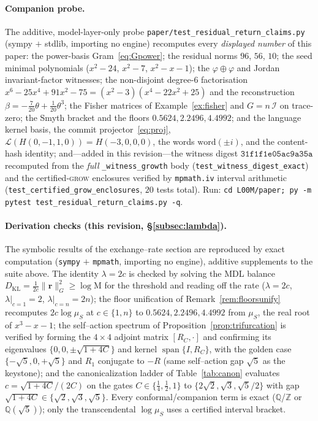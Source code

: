 \documentclass[11pt]{article}
\theoremstyle{plain}
\theoremstyle{definition}
\theoremstyle{remark}
\newcommand{\Q}{\mathbb{Q}}
\newcommand{\Z}{\mathbb{Z}}
\newcommand{\Mah}{\mathrm{M}}
\newcommand{\Fish}{\mathcal{I}}
\newcommand{\rr}{\mathbf{r}}
\newcommand{\GG}{G}
\newcommand{\Lop}{\mathcal{L}}
\DeclareMathOperator{\spn}{span}
\begin{document}
\paragraph{Companion probe.} The additive, model-layer-only probe
\texttt{paper/test\_residual\_return\_claims.py} (sympy $+$ stdlib, importing no engine) recomputes every
\emph{displayed number} of this paper: the power-basis Gram~\eqref{eq:Gpower}; the residual norms $96$, $56$,
$10$; the seed minimal polynomials ($x^2-24$, $x^2-7$, $x^2-x-1$); the $\varphi\oplus\varphi$ and Jordan
invariant-factor witnesses; the non-disjoint degree-$6$ factorisation
$x^6-25x^4+91x^2-75=(x^2-3)(x^4-22x^2+25)$ and the reconstruction
$\beta=-\tfrac7{20}\theta+\tfrac1{20}\theta^3$; the Fisher matrices of Example~\ref{ex:fisher} and
$\GG=n\,\Fish$ on trace-zero; the Smyth bracket and the floors $0.5624,2.2496,4.4992$; and the language
kernel basis, the commit projector~\eqref{eq:proj}, $\Lop(H(0,-1,1,0))=H(-3,0,0,0)$, the words
$\mathrm{word}(\pm i)$, and the content-hash identity; and---added in this revision---the witness digest
$\texttt{31f1f1e05ac9a35a}$ recomputed from the \emph{full} \texttt{\_witness\_growth} body
(\texttt{test\_witness\_digest\_exact}) and the certified-\textsc{grow} enclosures verified by
\texttt{mpmath.iv} interval arithmetic (\texttt{test\_certified\_grow\_enclosures}, $20$ tests total). Run:
\texttt{cd L00M/paper; py -m pytest test\_residual\_return\_claims.py -q}.

\paragraph{Derivation checks (this revision, \S\ref{subsec:lambda}).} The symbolic results of the exchange--rate
section are reproduced by exact computation (\texttt{sympy} $+$ \texttt{mpmath}, importing no engine), additive
supplements to the suite above. The identity $\lambda=2c$ is checked by solving the MDL balance
$D_{\mathrm{KL}}=\tfrac1{2c}\lVert\rr\rVert_\GG^2\ge\log\Mah$ for the threshold and reading off the rate
($\lambda=2c$, $\lambda|_{c=1}=2$, $\lambda|_{c=n}=2n$); the floor unification of Remark~\ref{rem:floorsunify}
recomputes $2c\log\mu_S$ at $c\in\{1,n\}$ to $0.5624,2.2496,4.4992$ from $\mu_S$, the real root of $x^3-x-1$; the
self--action spectrum of Proposition~\ref{prop:trifurcation} is verified by forming the $4\times4$ adjoint matrix
$[R_C,\cdot]$ and confirming its eigenvalues $\{0,0,\pm\sqrt{1+4C}\}$ and kernel $\spn\{I,R_C\}$, with the golden
case $\{-\sqrt5,0,+\sqrt5\}$ and $R_1$ conjugate to $-R$ (same self--action gap $\sqrt5$ as the keystone); and the canonicalization ladder of
Table~\ref{tab:canon} evaluates $c=\sqrt{1+4C}/(2C)$ on the gates $C\in\{\tfrac14,\tfrac12,1\}$ to
$\{2\sqrt2,\sqrt3,\sqrt5/2\}$ with gap $\sqrt{1+4C}\in\{\sqrt2,\sqrt3,\sqrt5\}$. Every conformal/companion term is
exact ($\Q$/$\Z$ or $\Q(\sqrt5)$); only the transcendental $\log\mu_S$ uses a certified interval bracket.
\end{document}
